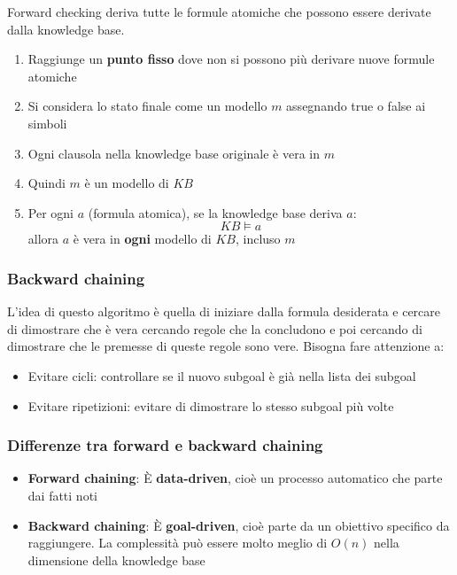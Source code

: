 \documentclass[a4paper]{article}
\begin{document}
\begin{definition}
  Forward checking deriva tutte le formule atomiche che possono essere derivate dalla knowledge
  base.
  \begin{enumerate}
    \item Raggiunge un \textbf{punto fisso} dove non si possono più derivare nuove formule
      atomiche
    \item Si considera lo stato finale come un modello \( m \) assegnando true o false
      ai simboli
    \item Ogni clausola nella knowledge base originale è vera in \( m \)
    \item Quindi \( m \) è un modello di \( KB \)
    \item Per ogni \( a \) (formula atomica), se la knowledge base deriva \( a \):
      \[
        KB \models a
      \] 
      allora \( a \) è vera in \textbf{ogni} modello di \( KB \), incluso \( m \)
  \end{enumerate}
\end{definition}

\subsubsection{Backward chaining}
L'idea di questo algoritmo è quella di iniziare dalla formula desiderata e
cercare di dimostrare che è vera cercando regole che la concludono
e poi cercando di dimostrare che le premesse di queste regole sono vere.
Bisogna fare attenzione a:
\begin{itemize}
  \item Evitare cicli: controllare se il nuovo subgoal è già nella lista dei subgoal
  \item Evitare ripetizioni: evitare di dimostrare lo stesso subgoal più volte
\end{itemize}

\subsubsection{Differenze tra forward e backward chaining}
\begin{itemize}
  \item \textbf{Forward chaining}:
    È \textbf{data-driven}, cioè un processo automatico che parte dai fatti noti
  \item \textbf{Backward chaining}:
    È \textbf{goal-driven}, cioè parte da un obiettivo specifico da raggiungere.
    La complessità può essere molto meglio di \( O(n) \) nella dimensione
    della knowledge base
\end{itemize}
\end{document}
